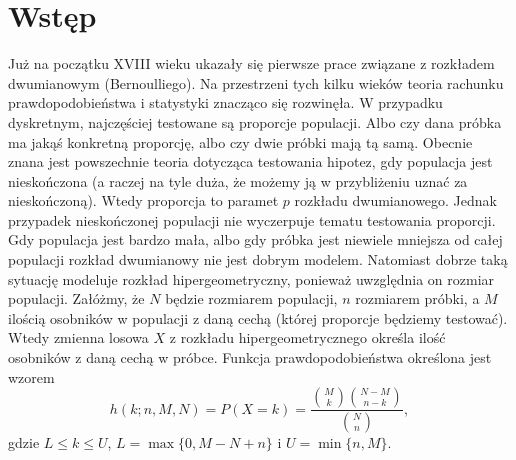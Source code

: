 \documentclass[twoside,a4paper,12pt]{book}
\begin{document}
	
\chapter*{Wstęp}
Już na początku XVIII wieku ukazały się pierwsze prace związane z rozkładem dwumianowym (Bernoulliego). Na przestrzeni tych kilku wieków teoria rachunku prawdopodobieństwa i statystyki znacząco się rozwinęła. W przypadku dyskretnym, najczęściej testowane są proporcje populacji. Albo czy dana próbka ma jakąś konkretną proporcję, albo czy dwie próbki mają tą samą. Obecnie znana jest powszechnie teoria dotycząca testowania hipotez, gdy populacja jest nieskończona (a raczej na tyle duża, że możemy ją w przybliżeniu uznać za nieskończoną). Wtedy proporcja to paramet $p$ rozkładu dwumianowego. Jednak przypadek nieskończonej populacji nie wyczerpuje tematu testowania proporcji. Gdy populacja jest bardzo mała, albo gdy próbka jest niewiele mniejsza od całej populacji rozkład dwumianowy nie jest dobrym modelem. Natomiast dobrze taką sytuację modeluje rozkład hipergeometryczny, ponieważ uwzględnia on rozmiar populacji. Załóżmy, że $N$ będzie rozmiarem populacji, $n$ rozmiarem próbki, a $M$ ilością osobników w populacji z daną cechą (której proporcje będziemy testować). Wtedy zmienna losowa $X$ z rozkładu hipergeometrycznego określa ilość osobników z daną cechą w próbce. Funkcja prawdopodobieństwa określona jest wzorem
\begin{equation}
h(k;n,M,N) = P(X=k) = \frac{\binom{M}{k} \binom{N-M}{n-k}}{\binom{N}{n}},
\end{equation}
gdzie $L\leq k\leq U$, $L=\max\{0,M-N+n\}$ i $U=\min\{n,M\}$.




\end{document}

